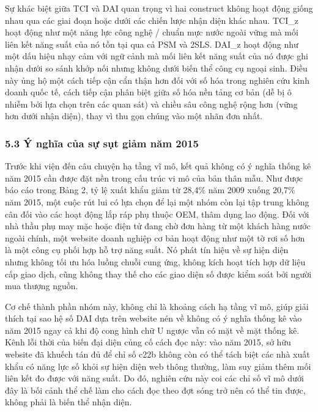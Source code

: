 \documentclass[12pt,a4paper]{article}
\begin{document}
Sự khác biệt giữa TCI và DAI quan trọng vì hai construct không hoạt động
giống nhau qua các giai đoạn hoặc dưới các chiến lược nhận diện khác
nhau. TCI\_z hoạt động như một năng lực công nghệ / chuẩn mực nước ngoài
vững mà mối liên kết năng suất của nó tồn tại qua cả PSM và 2SLS. DAI\_z
hoạt động như một dấu hiệu nhạy cảm với ngữ cảnh mà mối liên kết năng
suất của nó được ghi nhận dưới so sánh khớp nối nhưng không dưới biến
thể công cụ ngoại sinh. Điều này ủng hộ một cách tiếp cận cẩn thận hơn
đối với số hóa trong nghiên cứu kinh doanh quốc tế, cách tiếp cận phân
biệt giữa số hóa nền tảng cơ bản (dễ bị ô nhiễm bởi lựa chọn trên các
quan sát) và chiều sâu công nghệ rộng hơn (vững hơn dưới nhận diện),
thay vì thu gọn chúng vào một nhãn đơn nhất.

\hypertarget{53-uxfd-nghux129a-cux1ee7a-sux1ef1-sux1ee5t-giux1ea3m-nux103m-2015}{%
\subsubsection{5.3 Ý nghĩa của sự sụt giảm năm
2015}\label{53-uxfd-nghux129a-cux1ee7a-sux1ef1-sux1ee5t-giux1ea3m-nux103m-2015}}

Trước khi viện đến câu chuyện hạ tầng vĩ mô, kết quả không có ý nghĩa
thống kê năm 2015 cần được đặt nền trong cấu trúc vi mô của bản thân
mẫu. Như được báo cáo trong Bảng 2, tỷ lệ xuất khẩu giảm từ 28,4\% năm
2009 xuống 20,7\% năm 2015, một cuộc rút lui có lựa chọn để lại một nhóm
còn lại tập trung không cân đối vào các hoạt động lắp ráp phụ thuộc OEM,
thâm dụng lao động. Đối với nhà thầu phụ may mặc hoặc điện tử đang chờ
đơn hàng từ một khách hàng nước ngoài chính, một website doanh nghiệp cơ
bản hoạt động như một tờ rơi số hơn là một công cụ phối hợp hỗ trợ năng
suất. Nó phát tín hiệu về sự hiện diện nhưng không tối ưu hóa luồng
chuỗi cung ứng, không kích hoạt tích hợp dữ liệu cấp giao dịch, cũng
không thay thế cho các giao diện số được kiểm soát bởi người mua thượng
nguồn.

Cơ chế thành phần nhóm này, không chỉ là khoảng cách hạ tầng vĩ mô, giúp
giải thích tại sao hệ số DAI dựa trên website nén về không có ý nghĩa
thống kê vào năm 2015 ngay cả khi độ cong hình chữ U ngược vẫn có mặt về
mặt thống kê. Kênh lỗi thời của biến đại diện củng cố cách đọc này: vào
năm 2015, sở hữu website đã khuếch tán đủ để chỉ số c22b không còn có
thể tách biệt các nhà xuất khẩu có năng lực số khỏi sự hiện diện web
thông thường, làm suy giảm thêm mối liên kết đo được với năng suất. Do
đó, nghiên cứu này coi các chỉ số vĩ mô dưới đây là bối cảnh thể chế làm
cho cách đọc theo đợt sóng trở nên có thể tin được, không phải là biến
thể nhận diện.
\end{document}
